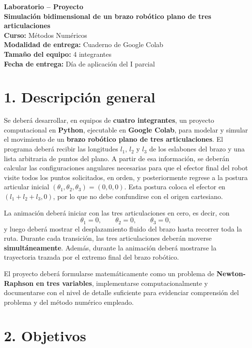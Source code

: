\documentclass[12pt]{article}
\begin{document}
\begin{center}
    {\Large \textbf{Laboratorio -- Proyecto}}\\[0.4em]
    {\large \textbf{Simulación bidimensional de un brazo robótico plano de tres articulaciones}}\\[1em]
    \textbf{Curso:} Métodos Numéricos\\
    \textbf{Modalidad de entrega:} Cuaderno de Google Colab\\
    \textbf{Tamaño del equipo:} 4 integrantes\\
    \textbf{Fecha de entrega:} Día de aplicación del I parcial
\end{center}

\section*{1. Descripción general}

Se deberá desarrollar, en equipos de \textbf{cuatro integrantes}, un proyecto computacional en \textbf{Python}, ejecutable en \textbf{Google Colab}, para modelar y simular el movimiento de un \textbf{brazo robótico plano de tres articulaciones}. El programa deberá recibir las longitudes \(l_1\), \(l_2\) y \(l_3\) de los eslabones del brazo y una lista arbitraria de puntos del plano. A partir de esa información, se deberán calcular las configuraciones angulares necesarias para que el efector final del robot visite todos los puntos solicitados, en orden, y posteriormente regrese a la postura articular inicial \((\theta_1,\theta_2,\theta_3)=(0,0,0)\). Esta postura coloca el efector en \((l_1+l_2+l_3,0)\), por lo que no debe confundirse con el origen cartesiano.

La animación deberá iniciar con las tres articulaciones en cero, es decir, con
\[
\theta_1=0,\qquad \theta_2=0,\qquad \theta_3=0,
\]
y luego deberá mostrar el desplazamiento fluido del brazo hasta recorrer toda la ruta. Durante cada transición, las tres articulaciones deberán moverse \textbf{simultáneamente}. Además, durante la animación deberá mostrarse la trayectoria trazada por el extremo final del brazo robótico.

El proyecto deberá formularse matemáticamente como un problema de \textbf{Newton-Raphson en tres variables}, implementarse computacionalmente y documentarse con el nivel de detalle suficiente para evidenciar comprensión del problema y del método numérico empleado.

\section*{2. Objetivos}
\end{document}
